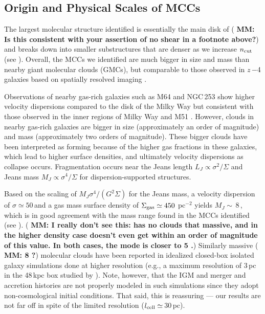 \IfFileExists{emulateapjlegacy.cls}{\documentclass[iop]{emulateapjlegacy}}{\documentclass[iop]{emulateapj}}
\newcommand{\MM}[1]{({\bf \color{mmcolor} MM: #1})}
\begin{document}
\subsection{Origin and Physical Scales of MCCs} \label{sec:origin}

The largest molecular structure identified is essentially the main
disk of \flower \MM{Is this consistent with your assertion of no shear
  in a footnote above?} and breaks down into smaller substructures that are
denser as we increase $n_{\rm cut}$ (see ). Overall, the MCCs we identified are much bigger in
size and mass than nearby giant molecular clouds (GMCs), but comparable to those observed in $z$\,$-$4 galaxies based on spatially resolved imaging \citep{Swinbank11a}.

Observations of nearby gas-rich galaxies such as M64 and NGC\,253 show
higher velocity dispersions compared to the disk
of the Milky Way but consistent with those observed in the inner regions of Milky Way and M51 \citep{Oka01a, Rosolowsky05a, Heyer09a, Hughes13b, Leroy15a, Rice16a}.  %
However, clouds in nearby gas-rich galaxies are bigger in size (approximately an order of magnitude) and mass (approximately two orders of magnitude).
These bigger clouds have been interpreted as 
    forming because of the higher gas fractions in these galaxies,
    which lead to higher
surface densities, and 
   ultimately velocity dispersions as collapse occurs.
Fragmentation occurs near the Jeans length $L_J\propto\sigma^2/\Sigma$ and
Jeans mass $M_J\propto\sigma^4/\Sigma$ for dispersion-supported structures.

Based on the scaling of $M_J$\eq$\sigma^4/(G^2\Sigma)$ for the Jeans mass, a
velocity dispersion of $\sigma\simeq50$\,\kms and a
gas mass surface density of $\Sigma_{\rm gas}\simeq450$\,\Msun\,pc$^{-2}$ yields
$M_J\sim$\,8\,\Msun, which is in good agreement with the mass
range found in the MCCs identified (see ).  \MM{I really
  don't see this: \Fig{dist} has no clouds that massive, and in
  the higher density case doesn't even get within an order of
  magnitude of this value.  In both cases, the mode is closer to 5\E{6} \Msun.}
%
Similarly massive \MM{8 \Msun?} molecular clouds have been reported in idealized closed-box isolated galaxy simulations done at higher resolution (e.g., a maximum
resolution of 3\,pc in the 48\,kpc box studied by \citealt{Behrendt16a}).
Note, however, that the IGM and merger and accretion histories are not properly modeled in such simulations since they adopt non-cosmological initial conditions. That said, this is reassuring --- our results are not far off in spite of the limited resolution ($l_{\rm cell}\simeq$\,30\,pc).
\end{document}
